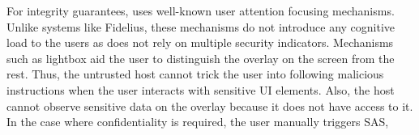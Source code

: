 For integrity guarantees, \name uses well-known user attention focusing mechanisms. Unlike systems like Fidelius, these mechanisms do not introduce any cognitive load to the users as \name does not rely on multiple security indicators. Mechanisms such as lightbox aid the user to distinguish the \device overlay on the screen from the rest. Thus, the untrusted host cannot trick the user into following malicious instructions when the user interacts with sensitive UI elements. Also, the host cannot observe sensitive data on the overlay because it does not have access to it. In the case where confidentiality is required, the user manually triggers SAS,  %

 
